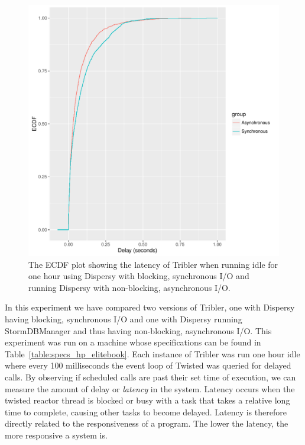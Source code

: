 \begin{figure}[!h]
	\centering
	\includegraphics[width=\linewidth]{experimentation/images/ecdf_latency_idle}
	\caption{The ECDF plot showing the latency of Tribler when running idle for one hour using Dispersy with blocking, synchronous I/O and running Dispersy with non-blocking, asynchronous I/O.}
	\label{fig:ecdf_latency_idle}
\end{figure} 

In this experiment we have compared two versions of Tribler, one with Dispersy having blocking, synchronous I/O and one with Dispersy running StormDBManager and thus having non-blocking, asynchronous I/O.
This experiment was run on a machine whose specifications can be found in Table~\ref{table:specs_hp_elitebook}.
Each instance of Tribler was run one hour idle where every 100 milliseconds the event loop of Twisted was queried for delayed calls.
By observing if scheduled calls are past their set time of execution, we can measure the amount of delay or \emph{latency} in the system.
Latency occurs when the twisted reactor thread is blocked or busy with a task that takes a relative long time to complete, causing other tasks to become delayed.
Latency is therefore directly related to the responsiveness of a program.
The lower the latency, the more responsive a system is.

